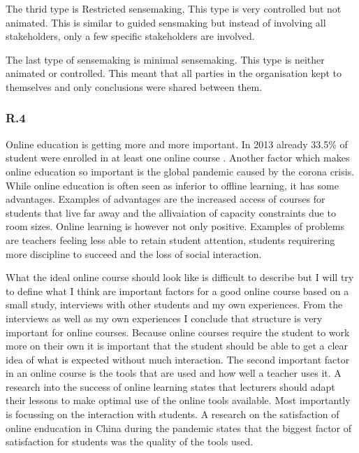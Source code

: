 \documentclass[]{article}
\begin{document}
The thrid type is Restricted sensemaking, 
This type is very controlled but not animated. 
This is similar to guided sensmaking but instead of involving all stakeholders, 
only a few specific stakeholders are involved.

The last type of sensemaking is minimal sensemaking.
This type is neither animated or controlled. This meant that all parties 
in the organisation kept to themselves and only conclusions were shared between them.



\subsubsection*{R.4}
Online education is getting more and more important. In 2013 already 33.5\% of 
student were enrolled in at least one online course \cite{allen2014grade}. Another 
factor which makes online education so important is the global pandemic caused by 
the corona crisis. While online education is often seen as inferior to offline learning,
it has some advantages. Examples of advantages are the increased access of courses 
for students that live far away and the allivaiation of capacity constraints due to 
room sizes\cite{volery2000critical}. Online learning is however not only positive.
Examples of problems are teachers feeling less able to retain student attention,
students requirering more discipline to succeed and the loss of social interaction\cite{allen2014grade}.

What the ideal online course should look like is difficult to describe but I will 
try to define what I think are important factors for a good online course based on 
a small study, interviews with other students and my own experiences. 
From the interviews as well as my own experiences I conclude that structure is very 
important for online courses. Because online courses require the student to work 
more on their own it is important that the student should be able to get a clear 
idea of what is expected without much interaction. The second important factor in an 
online course is the tools that are used and how well a teacher uses it. A research 
into the success of online learning\cite{volery2000critical} states that lecturers should
adapt their lessons to make optimal use of the online tools available. Most importantly 
is focussing on the interaction with students. A research on the satisfaction of 
online enducation in China during the pandemic\cite{chen2020analysis} states that 
the biggest factor of satisfaction for students was the quality of the tools used.
\end{document}
